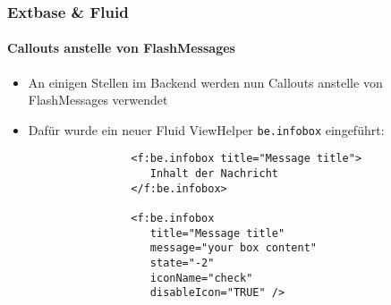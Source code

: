 %

\begin{frame}[fragile]
	\frametitle{Extbase \& Fluid}
	\framesubtitle{Callouts anstelle von FlashMessages}

	\begin{itemize}

		\item An einigen Stellen im Backend werden nun Callouts anstelle von FlashMessages verwendet

		\item Dafür wurde ein neuer Fluid ViewHelper \texttt{be.infobox} eingeführt:

			\begin{lstlisting}
				<f:be.infobox title="Message title">
				   Inhalt der Nachricht
				</f:be.infobox>

				<f:be.infobox
				   title="Message title"
				   message="your box content"
				   state="-2"
				   iconName="check"
				   disableIcon="TRUE" />
			\end{lstlisting}

	\end{itemize}

\end{frame}



